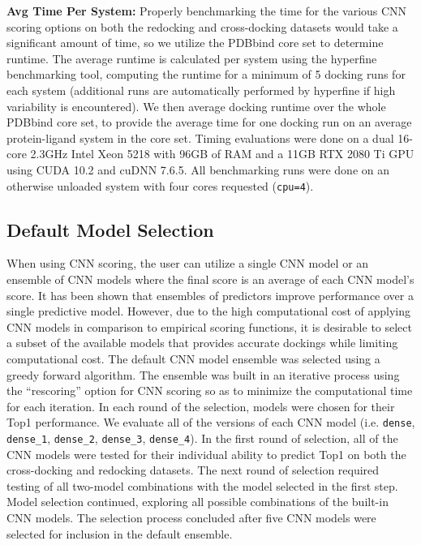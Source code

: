 \documentclass[journal=jcisd8,manuscript=article]{achemso}
\begin{document}
\textbf{Avg Time Per System:}
Properly benchmarking the time for the various CNN scoring options on both the redocking and cross-docking datasets would take a significant amount of time, so we utilize the PDBbind core set to determine runtime. The average runtime is calculated per system using the hyperfine benchmarking tool\cite{hyperfine}, computing the runtime for a minimum of 5 docking runs for each system (additional runs are automatically performed by hyperfine if high variability is encountered). We then average docking runtime over the whole PDBbind core set, to provide the average time for one docking run on an average protein-ligand system in the core set. Timing evaluations were done on a dual 16-core 2.3GHz Intel Xeon 5218 with 96GB of RAM and a 11GB RTX 2080 Ti GPU using CUDA 10.2 and cuDNN 7.6.5. All benchmarking runs were done on an otherwise unloaded system with four cores requested (\texttt{cpu=4}).

\subsection{Default Model Selection}
When using CNN scoring, the user can utilize a single CNN model or an ensemble of CNN models where the final score is an average of each CNN model's score. It has been shown that ensembles of predictors improve performance over a single predictive model\cite{dietterich2000ensemble}. However, due to the high computational cost of applying CNN models in comparison to empirical scoring functions, it is desirable to select a subset of the available models that provides accurate dockings while limiting computational cost. The default CNN model ensemble was selected using a greedy forward algorithm. The ensemble was built in an iterative process using the ``rescoring'' option for CNN scoring so as to minimize the computational time for each iteration. In each round of the selection, models were chosen for their Top1 performance. We evaluate all of the versions of each CNN model (i.e. \texttt{dense}, \texttt{dense\_1}, \texttt{dense\_2}, \texttt{dense\_3}, \texttt{dense\_4}). In the first round of selection, all of the CNN models were tested for their individual ability to predict Top1 on both the cross-docking and redocking datasets. The next round of selection required testing of all two-model combinations with the model selected in the first step. Model selection continued, exploring all possible combinations of the built-in CNN models. The selection process concluded after five CNN models were selected for inclusion in the default ensemble.
\end{document}
